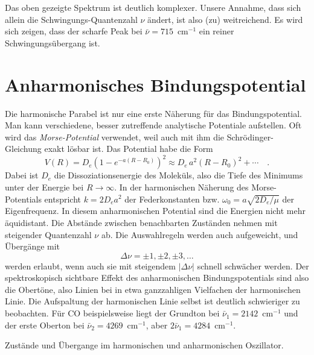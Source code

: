 Das oben gezeigte Spektrum ist deutlich komplexer. Unsere Annahme, dass sich allein die Schwingungs-Quantenzahl $\nu$ ändert, ist also (zu) weitreichend. Es wird sich zeigen, dass der scharfe Peak bei $\bar{\nu} = 715$~cm$^{-1}$ ein reiner Schwingungsübergang ist.

\section{Anharmonisches Bindungspotential}

Die harmonische Parabel ist nur eine erste Näherung für das Bindungspotential. Man kann verschiedene, besser zutreffende analytische Potentiale aufstellen. Oft wird das \emph{Morse-Potential} verwendet, weil auch mit ihm  die Schrödinger-Gleichung exakt lösbar ist. Das Potential habe die Form
\begin{equation}
 V(R) = D_e \left( 1 - e^{-a (R - R_0)} \right)^2 \approx D_e \, a^2 (R - R_0)^2 + \cdots \quad .
\end{equation}
Dabei ist $D_e$ die Dissoziationsenergie des Moleküls, also die Tiefe des Minimums unter der Energie bei $R \rightarrow \infty$. In der harmonischen Näherung des Morse-Potentials entspricht $k = 2 D_e a^2$ der Federkonstanten bzw. $\omega_0 = a \sqrt{2 D_e / \mu}$ der Eigenfrequenz. In diesem anharmonischen Potential  sind die Energien nicht mehr äquidistant. Die Abstände zwischen benachbarten Zuständen nehmen mit steigender Quantenzahl $\nu$ ab. Die Auswahlregeln werden auch aufgeweicht, und Übergänge mit 
\begin{equation}
\Delta \nu = \pm 1, \pm 2 , \pm 3, \dots
\end{equation}
werden erlaubt, wenn auch sie mit steigendem $|\Delta \nu |$ schnell schwächer werden. Der spektroskopisch sichtbare Effekt des anharmonischen Bindungspotentials sind also die Obertöne, also Linien bei in etwa ganzzahligen Vielfachen der harmonischen Linie. Die Aufspaltung der harmonischen Linie selbst ist deutlich schwieriger zu beobachten. Für CO beispielsweise liegt der Grundton bei $\bar{\nu}_1 = 2142$~cm$^{-1}$ und der erste Oberton bei 
 $\bar{\nu}_2 = 4269$~cm$^{-1}$, aber $2 \bar{\nu}_1 = 4284$~cm$^{-1}$.
 
\begin{marginfigure}
\caption{Zustände und Übergange im harmonischen und anharmonischen Oszillator.}
\end{marginfigure}
 
 
 
